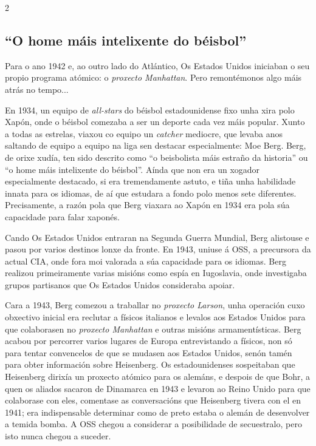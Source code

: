 \begin{multicols}{2}
\subsection*{``O home máis intelixente do béisbol''}

Para o ano 1942 e, ao outro lado do Atlántico, Os Estados Unidos iniciaban o
seu propio programa atómico: o \textit{proxecto Manhattan}. Pero remontémonos
algo máis atrás no tempo...

En 1934, un equipo de \textit{all-stars} do béisbol estadounidense fixo unha
xira polo Xapón, onde o béisbol comezaba a ser un deporte cada vez máis popular.
Xunto a todas as estrelas, viaxou co equipo un \textit{catcher} mediocre, que
levaba anos saltando de equipo a equipo na liga sen destacar especialmente: Moe
Berg. Berg, de orixe xudía, ten sido descrito como ``o beisbolista máis estraño
da historia'' ou ``o home máis intelixente do béisbol''. Aínda que non era un
xogador especialmente destacado, si era tremendamente astuto, e tiña unha
habilidade innata para os idiomas, de aí que estudara a fondo polo menos sete
diferentes. Precisamente, a razón pola que Berg viaxara ao Xapón en 1934 era
pola súa capacidade para falar xaponés.

Cando Os Estados Unidos entraran na Segunda Guerra Mundial, Berg alistouse e
pasou por varios destinos lonxe da fronte. En 1943, uniuse á OSS, a precursora
da actual CIA, onde fora moi valorada a súa capacidade para os idiomas. Berg
realizou primeiramente varias misións como espía en Iugoslavia, onde
investigaba grupos partisanos que Os Estados Unidos consideraba apoiar.

Cara a 1943, Berg comezou a traballar no \textit{proxecto Larson}, unha
operación cuxo obxectivo inicial era reclutar a físicos italianos e levalos aos
Estados Unidos para que colaborasen no \textit{proxecto Manhattan} e outras
misións armamentísticas. Berg acabou por percorrer varios lugares de Europa
entrevistando a físicos, non só para tentar convencelos de que se mudasen aos
Estados Unidos, senón tamén para obter información sobre Heisenberg. Os
estadounidenses sospeitaban que Heisenberg dirixía un proxecto atómico para os
alemáns, e despois de que Bohr, a quen os aliados sacaron de Dinamarca en 1943
e levaron ao Reino Unido para que colaborase con eles, comentase as
conversacións que Heisenberg tivera con el en 1941; era indispensable
determinar como de preto estaba o alemán de desenvolver a temida bomba. A OSS
chegou a considerar a posibilidade de secuestralo, pero isto nunca chegou a
suceder.


\end{multicols}
